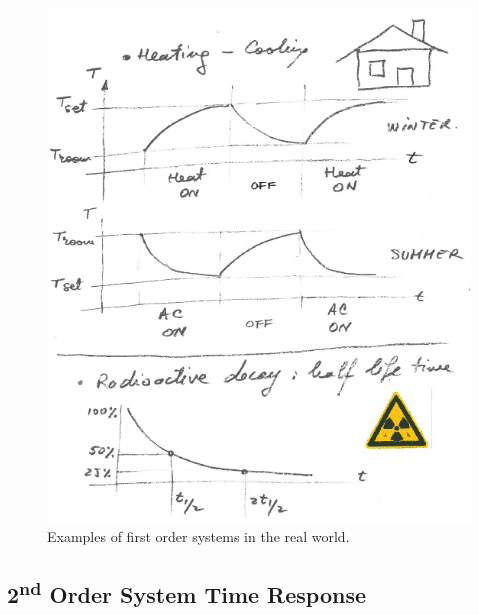 \documentclass[12pt,letter]{article}
\newtheorem{ex}{Example}
\numberwithin{ex}{section} %
\newenvironment{example}{\begin{mdframed}[middlelinewidth=0.5mm]\begin{ex}\normalfont}{\end{ex}\end{mdframed}}
\numberwithin{re}{section} %
\numberwithin{equation}{section}	%
\begin{document}
\begin{figure}[H]
	\centering
	\includegraphics[width=4.5in]{../figures/real_world_first_order_system_response}
	\caption{Examples of first order systems in the real world.}
\end{figure}

%


\subsection{2\textsuperscript{nd} Order System Time Response}
\end{document}

